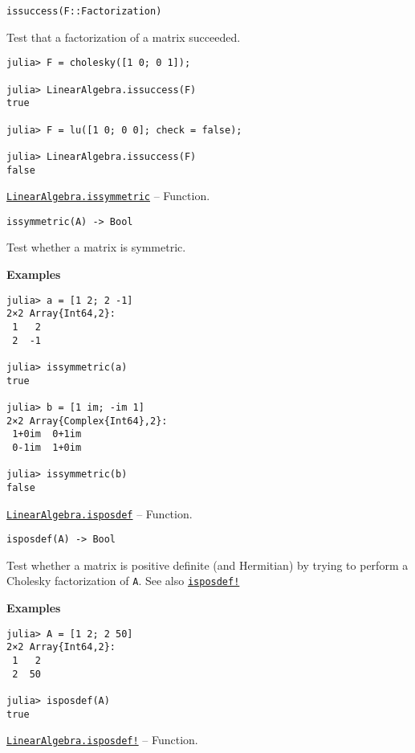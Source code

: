 \begin{adjustwidth}{2em}{0pt}


\begin{verbatim}
issuccess(F::Factorization)
\end{verbatim}

Test that a factorization of a matrix succeeded.


\begin{verbatim}
julia> F = cholesky([1 0; 0 1]);

julia> LinearAlgebra.issuccess(F)
true

julia> F = lu([1 0; 0 0]; check = false);

julia> LinearAlgebra.issuccess(F)
false
\end{verbatim}



\end{adjustwidth}
\hypertarget{2326080217547608316}{} 
\hyperlink{2326080217547608316}{\texttt{LinearAlgebra.issymmetric}}  -- {Function.}

\begin{adjustwidth}{2em}{0pt}


\begin{verbatim}
issymmetric(A) -> Bool
\end{verbatim}

Test whether a matrix is symmetric.

\textbf{Examples}


\begin{verbatim}
julia> a = [1 2; 2 -1]
2×2 Array{Int64,2}:
 1   2
 2  -1

julia> issymmetric(a)
true

julia> b = [1 im; -im 1]
2×2 Array{Complex{Int64},2}:
 1+0im  0+1im
 0-1im  1+0im

julia> issymmetric(b)
false
\end{verbatim}



\end{adjustwidth}
\hypertarget{13841568437070319804}{} 
\hyperlink{13841568437070319804}{\texttt{LinearAlgebra.isposdef}}  -- {Function.}

\begin{adjustwidth}{2em}{0pt}


\begin{verbatim}
isposdef(A) -> Bool
\end{verbatim}

Test whether a matrix is positive definite (and Hermitian) by trying to perform a Cholesky factorization of \texttt{A}. See also \hyperlink{15124613555733932079}{\texttt{isposdef!}}

\textbf{Examples}


\begin{verbatim}
julia> A = [1 2; 2 50]
2×2 Array{Int64,2}:
 1   2
 2  50

julia> isposdef(A)
true
\end{verbatim}



\end{adjustwidth}
\hypertarget{15124613555733932079}{} 
\hyperlink{15124613555733932079}{\texttt{LinearAlgebra.isposdef!}}  -- {Function.}


